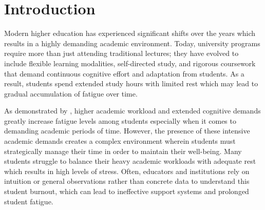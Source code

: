 \documentclass [12pt]{article}
\begin{document}
\begin{abstract}
    This study explores the dynamics of student fatigue and recovery using a combined approach of mathematical modeling and Structural Equation Modeling (SEM). Data were collected from 274 BS Mathematics students across Applied Statistics, Computer Science, and Business Applications programs under the College of Science using a 5-point Likert scale survey measuring study load, academic stress, sleep quality, time management, fatigue level, and academic performance. SEM results revealed that study load and academic stress significantly increase fatigue, while sleep quality and time management significantly reduce it. However, fatigue level was found to have no significant direct effect on academic performance. A time-based differential equation model was created to model student fatigue and recovery. Empirical parameters used in the model were derived from the SEM analysis. The model revealed that an increase in study time results in a constant increase in student fatigue. In addition, it shows how important it is to find a balance between schoolwork and time to rest. It also demonstrates how mathematical modeling can enhance our comprehension of student well-being and facilitate the planning of effective academic interventions grounded in data.
\end{abstract}

\newpage

\section*{Introduction}

Modern higher education has experienced significant shifts over the years which results in a highly demanding academic environment. Today, university programs require more than just attending traditional lectures; they have evolved to include flexible learning modalities, self-directed study, and rigorous coursework that demand continuous cognitive effort and adaptation from students. As a result, students spend extended study hours with limited rest which may lead to gradual accumulation of fatigue over time. 

As demonstrated by \textcite{bouloukaki2023academic}, higher academic workload and extended cognitive demands greatly increase fatigue levels among students especially when it comes to demanding academic periods of time. However, the presence of these intensive academic demands creates a complex environment wherein students must strategically manage their time in order to maintain their well-being. Many students struggle to balance their heavy academic workloads with adequate rest which results in high levels of stress. Often, educators and institutions rely on intuition or general observations rather than concrete data to understand this student burnout, which can lead to ineffective support systems and prolonged student fatigue.
\end{document}
